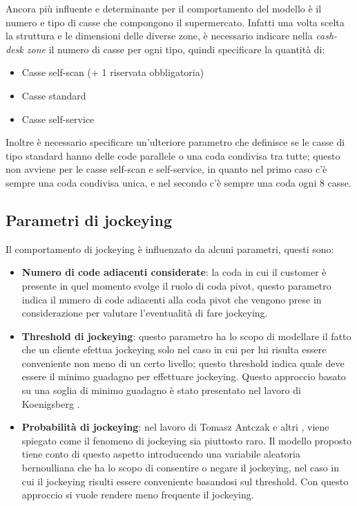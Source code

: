 Ancora più influente e determinante per il comportamento del modello è il numero e tipo di casse che compongono il supermercato. Infatti una volta scelta la struttura e le dimensioni delle diverse zone, è necessario indicare nella \textit{cash-desk zone} il numero di casse per ogni tipo, quindi specificare la quantità di:
\begin{itemize}
	\item Casse self-scan (+ 1 riservata obbligatoria)
	\item Casse standard
	\item Casse self-service
\end{itemize}

Inoltre è necessario specificare un'ulteriore parametro che definisce se le casse di tipo standard hanno delle code parallele o una coda condivisa tra tutte; questo non avviene per le casse self-scan e self-service, in quanto nel primo caso c'è sempre una coda condivisa unica, e nel secondo c'è sempre una coda ogni 8 casse.

\subsection{Parametri di jockeying}
Il comportamento di jockeying è influenzato da alcuni parametri, questi sono:
\begin{itemize}
	\item \textbf{Numero di code adiacenti considerate}: la coda in cui il customer è presente in quel momento svolge il ruolo di coda pivot, questo parametro indica il numero di code adiacenti alla coda pivot che vengono prese in considerazione per valutare l'eventualità di fare jockeying.
	\item \textbf{Threshold di jockeying}: questo parametro ha lo scopo di modellare il fatto che un cliente efettua jockeying solo nel caso in cui per lui risulta essere conveniente non meno di un certo livello; questo threshold indica quale deve essere il minimo guadagno per effettuare jockeying. Questo approccio basato su una soglia di minimo guadagno è stato presentato nel lavoro di Koenigsberg \cite{koenigsberg1966jockeying}.
	\item \textbf{Probabilità di jockeying}: nel lavoro di Tomasz Antczak e altri \cite{article1}, viene spiegato come il fenomeno di jockeying sia piuttosto raro. Il modello proposto tiene conto di questo aspetto introducendo una variabile aleatoria bernoulliana che ha lo scopo di consentire o negare il jockeying, nel caso in cui il jockeying risulti essere conveniente basandosi sul threshold. Con questo approccio si vuole rendere meno frequente il jockeying.
\end{itemize}

